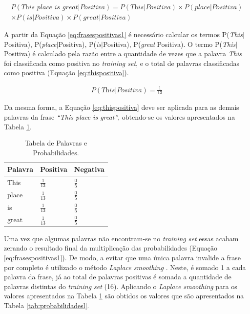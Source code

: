 \begin{equation}
\begin{gathered}
P(\textit{This place is great}|Positiva) = P(\textit{This}|Positiva)
\times P(\textit{place}|Positiva) \\ \times P(\textit{is}|Positiva) \times
P(\textit{great}|Positiva)
\label{eq:frasespositivas1}
\end{gathered}
\end{equation}

A partir da Equação \ref{eq:frasespositivas1} é necessário calcular os
termos P(\textit{This}$\vert$Positiva),
P(\textit{place}$\vert$Positiva), P(\textit{is}$\vert$Positiva), P(\textit{great}$\vert$Positiva).
O termo P(\textit{This}$\vert$Positiva) é calculado pela razão entre a
quantidade de vezes que a palavra \textit{This} foi classificada como positiva
no \textit{training set}, e o total de palavras classificadas como positiva
(Equação \ref{eq:thispositiva}).

\begin{equation}
\begin{gathered}
P(\textit{This}|Positiva) = \frac{1}{13}
\label{eq:thispositiva}
\end{gathered}
\end{equation}


Da mesma forma, a Equação \ref{eq:thispositiva} deve ser aplicada para as demais
palavras da frase \textit{``This place is great''}, obtendo-se os valores
apresentados na Tabela \ref{tab:probabilidadesnb}.

\begin{table}[htb]
\centering
\renewcommand{\arraystretch}{1.5}%
\begin{tabular}{lll}
\hline

Palavra & Positiva & Negativa \\ \hline
This & \large $\frac{1}{13}$ & \large $\frac{0}{5}$ \\
place & \large $\frac{1}{13}$ & \large $\frac{0}{5}$ \\
is & \large $\frac{1}{13}$ & \large $\frac{0}{5}$ \\
great & \large $\frac{1}{13}$ & \large $\frac{0}{5}$ \\
\end{tabular}
\caption{Tabela de Palavras e Probabilidades.}
\label{tab:probabilidadesnb}
\end{table}

Uma vez que algumas palavras não encontram-se no \textit{training set}
essas acabam zerando o resultado final da
multiplicação das probabilidades (Equação
\ref{eq:frasespositivas1}). De modo, a evitar que uma única palavra
invalide a frase por completo é utilizado o método \textit{Laplace smoothing}
\cite{Manning:2008:IIR:1394399}. Neste, é somado 1 a cada palavra da frase, já
ao total de palavras positivas é somada a quantidade de palavras distintas do
\textit{training set} (16). Aplicando o \textit{Laplace smoothing} para os
valores apresentados na Tabela \ref{tab:probabilidadesnb} são obtidos os valores
que são apresentados na Tabela \ref{tab:probabilidadesl}.



